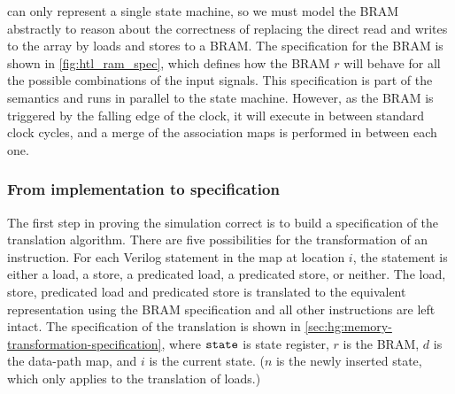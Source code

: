 \htl{} can only represent a single state machine, so we must model the
\gls{BRAM} abstractly to reason about the correctness of replacing the direct
read and writes to the array by loads and stores to a \gls{BRAM}.  The
specification for the \gls{BRAM} is shown in \cref{fig:htl_ram_spec}, which
defines how the \gls{BRAM} $r$ will behave for all the possible combinations of
the input signals.  This specification is part of the \htl{} semantics and runs
in parallel to the state machine.  However, as the \gls{BRAM} is triggered by
the falling edge of the clock, it will execute in between standard clock cycles,
and a merge of the association maps is performed in between each one.

\subsubsection{From implementation to specification}

The first step in proving the simulation correct is to build a specification of
the translation algorithm.  There are five possibilities for the transformation
of an instruction. For each Verilog statement in the map at location $i$, the
statement is either a load, a store, a predicated load, a predicated store, or
neither. The load, store, predicated load and predicated store is translated to
the equivalent representation using the \gls{BRAM} specification and all other
instructions are left intact.  The specification of the translation is shown in
\cref{sec:hg:memory-transformation-specification}, where $\texttt{state}$ is state
register, $r$ is the \gls{BRAM}, $d$ is the data-path map, and $i$ is the
current state.  ($n$ is the newly inserted state, which only applies to the
translation of loads.)

\newcommand\nonblockasgn{\mathrel{\texttt{<=}}}
\newcommand\blockasgn{\mathrel{\texttt{=}}}
\newcommand\msemi{\texttt{;}\ }
\newcommand\mternary[3]{#1\mathbin{\texttt{?}}#2\mathbin{\texttt{:}}#3}
\newcommand\mxor{\oplus}
\newcommand\verilogeq{\mathbin{\texttt{==}}}

